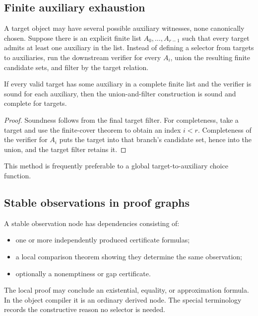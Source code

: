\subsection{Finite auxiliary exhaustion}

A target object may have several possible auxiliary witnesses, none canonically chosen.  Suppose there is an explicit finite list \(A_0,\ldots,A_{r-1}\) such that every target admits at least one auxiliary in the list.  Instead of defining a selector from targets to auxiliaries, run the downstream verifier for every \(A_i\), union the resulting finite candidate sets, and filter by the target relation.

\begin{proposition}
If every valid target has some auxiliary in a complete finite list and the verifier is sound for each auxiliary, then the union-and-filter construction is sound and complete for targets.
\end{proposition}

\begin{proof}
Soundness follows from the final target filter.  For completeness, take a target and use the finite-cover theorem to obtain an index \(i<r\).  Completeness of the verifier for \(A_i\) puts the target into that branch's candidate set, hence into the union, and the target filter retains it.
\end{proof}

This method is frequently preferable to a global target-to-auxiliary choice function.

\subsection{Stable observations in proof graphs}

A stable observation node has dependencies consisting of:
\begin{itemize}
\item one or more independently produced certificate formulas;
\item a local comparison theorem showing they determine the same observation;
\item optionally a nonemptiness or gap certificate.
\end{itemize}
The local proof may conclude an existential, equality, or approximation formula.  In the object compiler it is an ordinary derived node.  The special terminology records the constructive reason no selector is needed.

